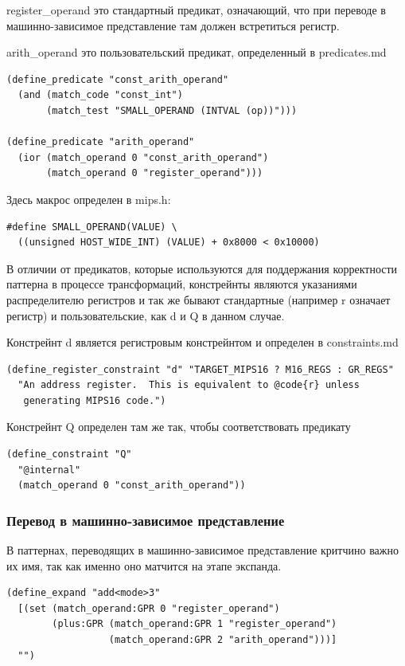 \documentclass[a4paper,12pt,oneside]{article}
\begin{document}
register\_operand это стандартный предикат, означающий, что при переводе в машинно-зависимое представление там должен встретиться регистр.

arith\_operand это пользовательский предикат, определенный в predicates.md

\begin{verbatim}
(define_predicate "const_arith_operand"
  (and (match_code "const_int")
       (match_test "SMALL_OPERAND (INTVAL (op))")))

(define_predicate "arith_operand"
  (ior (match_operand 0 "const_arith_operand")
       (match_operand 0 "register_operand")))
\end{verbatim}

Здесь макрос определен в mips.h:

\begin{lstlisting}
#define SMALL_OPERAND(VALUE) \
  ((unsigned HOST_WIDE_INT) (VALUE) + 0x8000 < 0x10000)
\end{lstlisting}

В отличии от предикатов, которые используются для поддержания корректности паттерна в процессе трансформаций, констрейнты являются указаниями распределителю регистров и так же бывают стандартные (например r означает регистр) и пользовательские, как d и Q в данном случае.

Констрейнт d является регистровым констрейнтом и определен в constraints.md

\begin{verbatim}
(define_register_constraint "d" "TARGET_MIPS16 ? M16_REGS : GR_REGS"
  "An address register.  This is equivalent to @code{r} unless
   generating MIPS16 code.")
\end{verbatim}

Констрейнт Q определен там же так, чтобы соответствовать предикату

\begin{verbatim}
(define_constraint "Q"
  "@internal"
  (match_operand 0 "const_arith_operand"))
\end{verbatim}

\subsubsection{Перевод в машинно-зависимое представление}

В паттернах, переводящих в машинно-зависимое представление критчино важно их имя, так как именно оно матчится на этапе экспанда.

\begin{verbatim}
(define_expand "add<mode>3"
  [(set (match_operand:GPR 0 "register_operand")
        (plus:GPR (match_operand:GPR 1 "register_operand")
                  (match_operand:GPR 2 "arith_operand")))]
  "")
\end{verbatim}
\end{document}
